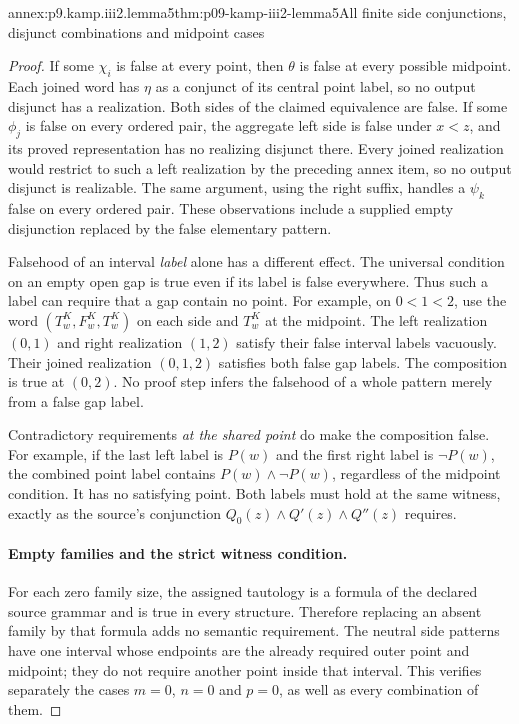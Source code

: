 \begin{annexitem}{annex:p9.kamp.iii2.lemma5}{thm:p09-kamp-iii2-lemma5}{All finite side conjunctions, disjunct combinations and midpoint cases}
\begin{proof}
If some \(\chi_i\) is false at every point, then \(\theta\) is
false at every possible midpoint. Each joined word has \(\eta\)
as a conjunct of its central point label, so no output disjunct has
a realization. Both sides of the claimed equivalence are false.
If some \(\phi_j\) is false on every ordered pair, the aggregate
left side is false under \(x<z\), and its proved representation
has no realizing disjunct there. Every joined realization would
restrict to such a left realization by the preceding annex item,
so no output disjunct is realizable. The same argument, using the
right suffix, handles a \(\psi_k\) false on every ordered pair.
These observations include a supplied empty disjunction replaced
by the false elementary pattern.

Falsehood of an interval \emph{label} alone has a different effect.
The universal condition on an empty open gap is true even if its
label is false everywhere. Thus such a label can require that a
gap contain no point. For example, on \(0<1<2\), use the word
\((T^K_w,F^K_w,T^K_w)\) on each side and \(T^K_w\) at the
midpoint. The left realization \((0,1)\) and right realization
\((1,2)\) satisfy their false interval labels vacuously. Their
joined realization \((0,1,2)\) satisfies both false gap labels.
The composition is true at \((0,2)\). No proof step infers the
falsehood of a whole pattern merely from a false gap label.

Contradictory requirements \emph{at the shared point} do make the
composition false. For example, if the last left label is \(P(w)\)
and the first right label is \(\neg P(w)\), the combined point
label contains \(P(w)\land\neg P(w)\), regardless of the midpoint
condition. It has no satisfying point. Both labels must hold at
the same witness, exactly as the source's conjunction
\(Q_0(z)\land Q'(z)\land Q''(z)\) requires.

\paragraph{Empty families and the strict witness condition.}
For each zero family size, the assigned tautology is a formula of the
declared source grammar and is true in every structure. Therefore
replacing an absent family by that formula adds no semantic requirement.
The neutral side patterns have one interval whose endpoints are the
already required outer point and midpoint; they do not require another
point inside that interval. This verifies separately the cases
\(m=0\), \(n=0\) and \(p=0\), as well as every combination of them.


\end{proof}
\end{annexitem}
